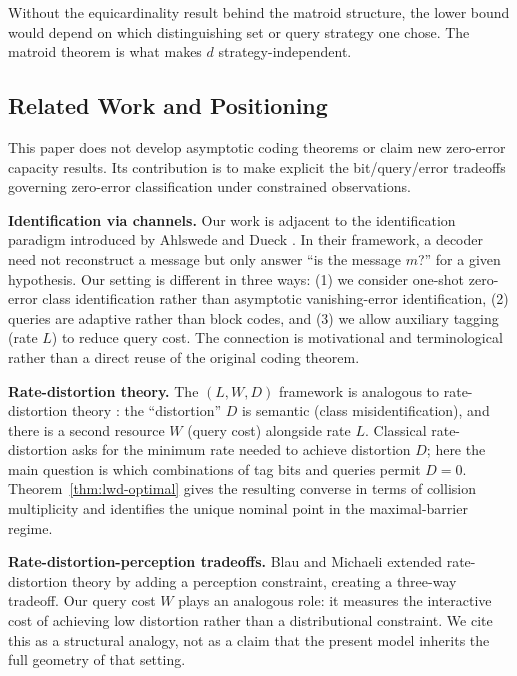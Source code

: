 Without the equicardinality result behind the matroid structure, the lower bound would depend on which distinguishing set or query strategy one chose. The matroid theorem is what makes $d$ strategy-independent.

\subsection{Related Work and Positioning}

This paper does not develop asymptotic coding theorems or claim new zero-error capacity results. Its contribution is to make explicit the bit/query/error tradeoffs governing zero-error classification under constrained observations.

\textbf{Identification via channels.} Our work is adjacent to the identification paradigm introduced by Ahlswede and Dueck \cite{ahlswede1989identification, ahlswede1989identification2}. In their framework, a decoder need not reconstruct a message but only answer ``is the message $m$?'' for a given hypothesis. Our setting is different in three ways: (1) we consider one-shot zero-error class identification rather than asymptotic vanishing-error identification, (2) queries are adaptive rather than block codes, and (3) we allow auxiliary tagging (rate $L$) to reduce query cost. The connection is motivational and terminological rather than a direct reuse of the original coding theorem.

\textbf{Rate-distortion theory.} The $(L, W, D)$ framework is analogous to rate-distortion theory \cite{shannon1959coding, berger1971rate}: the ``distortion'' $D$ is semantic (class misidentification), and there is a second resource $W$ (query cost) alongside rate $L$. Classical rate-distortion asks for the minimum rate needed to achieve distortion $D$; here the main question is which combinations of tag bits and queries permit $D=0$. Theorem~\ref{thm:lwd-optimal} gives the resulting converse in terms of collision multiplicity and identifies the unique nominal point in the maximal-barrier regime.

\textbf{Rate-distortion-perception tradeoffs.} Blau and Michaeli \cite{blau2019rethinking} extended rate-distortion theory by adding a perception constraint, creating a three-way tradeoff. Our query cost $W$ plays an analogous role: it measures the interactive cost of achieving low distortion rather than a distributional constraint. We cite this as a structural analogy, not as a claim that the present model inherits the full geometry of that setting.

